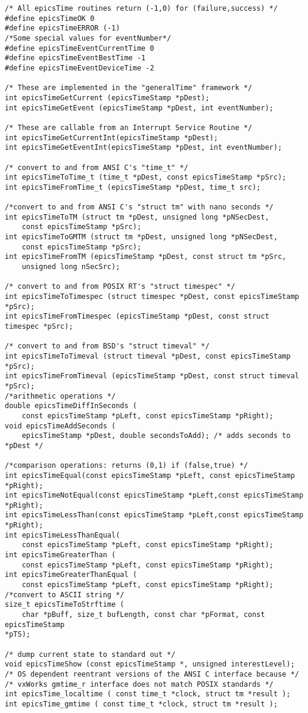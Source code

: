 \begin{verbatim}
/* All epicsTime routines return (-1,0) for (failure,success) */
#define epicsTimeOK 0
#define epicsTimeERROR (-1)
/*Some special values for eventNumber*/
#define epicsTimeEventCurrentTime 0
#define epicsTimeEventBestTime -1
#define epicsTimeEventDeviceTime -2

/* These are implemented in the "generalTime" framework */
int epicsTimeGetCurrent (epicsTimeStamp *pDest);
int epicsTimeGetEvent (epicsTimeStamp *pDest, int eventNumber);

/* These are callable from an Interrupt Service Routine */
int epicsTimeGetCurrentInt(epicsTimeStamp *pDest);
int epicsTimeGetEventInt(epicsTimeStamp *pDest, int eventNumber);

/* convert to and from ANSI C's "time_t" */
int epicsTimeToTime_t (time_t *pDest, const epicsTimeStamp *pSrc);
int epicsTimeFromTime_t (epicsTimeStamp *pDest, time_t src);

/*convert to and from ANSI C's "struct tm" with nano seconds */
int epicsTimeToTM (struct tm *pDest, unsigned long *pNSecDest,
    const epicsTimeStamp *pSrc);
int epicsTimeToGMTM (struct tm *pDest, unsigned long *pNSecDest,
    const epicsTimeStamp *pSrc);
int epicsTimeFromTM (epicsTimeStamp *pDest, const struct tm *pSrc,
    unsigned long nSecSrc);

/* convert to and from POSIX RT's "struct timespec" */
int epicsTimeToTimespec (struct timespec *pDest, const epicsTimeStamp *pSrc);
int epicsTimeFromTimespec (epicsTimeStamp *pDest, const struct timespec *pSrc);

/* convert to and from BSD's "struct timeval" */
int epicsTimeToTimeval (struct timeval *pDest, const epicsTimeStamp *pSrc);
int epicsTimeFromTimeval (epicsTimeStamp *pDest, const struct timeval *pSrc);
/*arithmetic operations */
double epicsTimeDiffInSeconds (
    const epicsTimeStamp *pLeft, const epicsTimeStamp *pRight);
void epicsTimeAddSeconds (
    epicsTimeStamp *pDest, double secondsToAdd); /* adds seconds to *pDest */

/*comparison operations: returns (0,1) if (false,true) */
int epicsTimeEqual(const epicsTimeStamp *pLeft, const epicsTimeStamp *pRight);
int epicsTimeNotEqual(const epicsTimeStamp *pLeft,const epicsTimeStamp *pRight);
int epicsTimeLessThan(const epicsTimeStamp *pLeft,const epicsTimeStamp *pRight);
int epicsTimeLessThanEqual(
    const epicsTimeStamp *pLeft, const epicsTimeStamp *pRight);
int epicsTimeGreaterThan (
    const epicsTimeStamp *pLeft, const epicsTimeStamp *pRight);
int epicsTimeGreaterThanEqual (
    const epicsTimeStamp *pLeft, const epicsTimeStamp *pRight);
/*convert to ASCII string */
size_t epicsTimeToStrftime (
    char *pBuff, size_t bufLength, const char *pFormat, const epicsTimeStamp 
*pTS);

/* dump current state to standard out */
void epicsTimeShow (const epicsTimeStamp *, unsigned interestLevel);
/* OS dependent reentrant versions of the ANSI C interface because */
/* vxWorks gmtime_r interface does not match POSIX standards */
int epicsTime_localtime ( const time_t *clock, struct tm *result );
int epicsTime_gmtime ( const time_t *clock, struct tm *result );

\end{verbatim}

